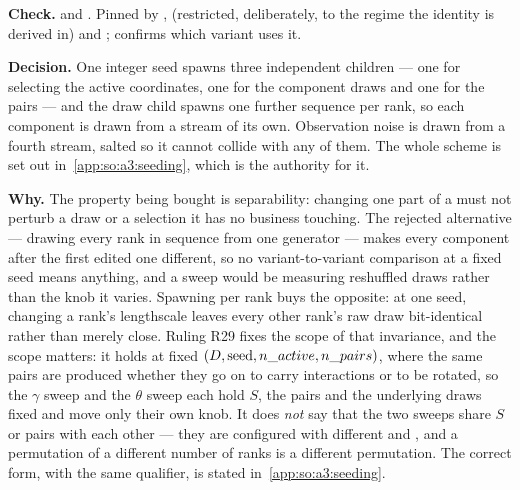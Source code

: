\begin{sloppypar}
\textbf{Check.}  and
. Pinned by
,
(restricted, deliberately, to the regime the identity is derived in) and
;
confirms which variant uses it.
\end{sloppypar}

\label{app:so:a4:d6}

\textbf{Decision.} One integer seed spawns three independent
 children --- one for selecting the active coordinates,
one for the component draws and one for the pairs --- and the draw child spawns
one further sequence per rank, so each component is drawn from a stream of its
own. Observation noise is drawn from a fourth stream, salted so it cannot
collide with any of them. The whole scheme is set out
in~\ref{app:so:a3:seeding}, which is the authority for it.

\textbf{Why.} The property being bought is separability: changing one part of a
 must not perturb a draw or a selection it has no business
touching. The rejected alternative --- drawing every rank in sequence from one
generator --- makes every component after the first edited one different, so no
variant-to-variant comparison at a fixed seed means anything, and a sweep would
be measuring reshuffled draws rather than the knob it varies. Spawning per rank
buys the opposite: at one seed, changing a rank's lengthscale leaves every
other rank's raw draw bit-identical rather than merely close. Ruling R29 fixes
the scope of that invariance, and the scope matters: it holds at fixed
$(D, \text{seed}, \SOcode{n\_active}, \SOcode{n\_pairs})$, where the same pairs
are produced whether they go on to carry interactions or to be rotated, so the
$\gamma$ sweep and the $\theta$ sweep each hold $S$, the pairs and the
underlying draws fixed and move only their own knob. It does \emph{not} say
that the two sweeps share $S$ or pairs with each other --- they are configured
with different  and , and a permutation of a
different number of ranks is a different permutation. The correct form, with
the same qualifier, is stated in~\ref{app:so:a3:seeding}.

